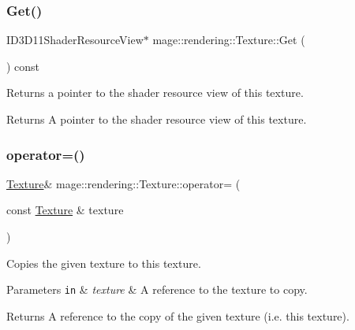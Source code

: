 \subsubsection{\texorpdfstring{Get()}{Get()}}
{\footnotesize\ttfamily I\+D3\+D11\+Shader\+Resource\+View$\ast$ mage\+::rendering\+::\+Texture\+::\+Get (\begin{DoxyParamCaption}{ }\end{DoxyParamCaption}) const\hspace{0.3cm}{\ttfamily [noexcept]}}

Returns a pointer to the shader resource view of this texture.

\begin{DoxyReturn}{Returns}
A pointer to the shader resource view of this texture. 
\end{DoxyReturn}
\hypertarget{classmage_1_1rendering_1_1_texture_a8d6af2ca731e11e2f0ef382bc8417234}{}\label{classmage_1_1rendering_1_1_texture_a8d6af2ca731e11e2f0ef382bc8417234} 
\subsubsection{\texorpdfstring{operator=()}{operator=()}\hspace{0.1cm}{\footnotesize\ttfamily [1/2]}}
{\footnotesize\ttfamily \hyperlink{classmage_1_1rendering_1_1_texture}{Texture}\& mage\+::rendering\+::\+Texture\+::operator= (\begin{DoxyParamCaption}\item[{const \hyperlink{classmage_1_1rendering_1_1_texture}{Texture} \&}]{texture }\end{DoxyParamCaption})\hspace{0.3cm}{\ttfamily [delete]}}

Copies the given texture to this texture.


\begin{DoxyParams}[1]{Parameters}
\mbox{\tt in}  & {\em texture} & A reference to the texture to copy. \\
\hline
\end{DoxyParams}
\begin{DoxyReturn}{Returns}
A reference to the copy of the given texture (i.\+e. this texture). 
\end{DoxyReturn}
\hypertarget{classmage_1_1rendering_1_1_texture_a8c9062f5d8045272c254eb0fa1ab4feb}{}\label{classmage_1_1rendering_1_1_texture_a8c9062f5d8045272c254eb0fa1ab4feb} 
